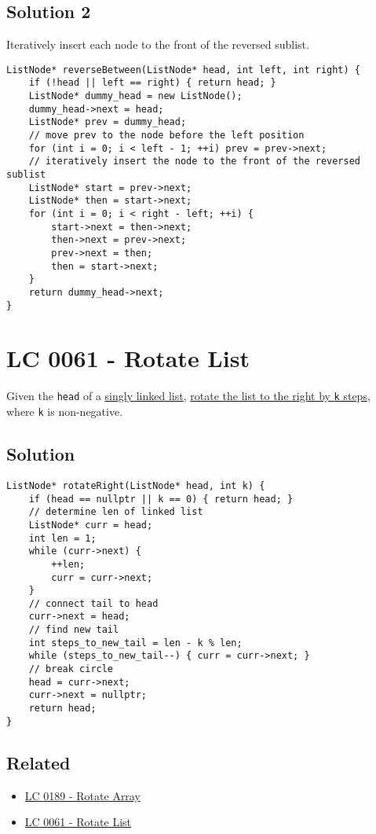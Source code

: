 \subsection*{Solution 2}
Iteratively insert each node to the front of the reversed sublist.
\begin{lstlisting}
ListNode* reverseBetween(ListNode* head, int left, int right) {
	if (!head || left == right) { return head; }
	ListNode* dummy_head = new ListNode();
	dummy_head->next = head;
	ListNode* prev = dummy_head;
	// move prev to the node before the left position
	for (int i = 0; i < left - 1; ++i) prev = prev->next;
	// iteratively insert the node to the front of the reversed sublist
	ListNode* start = prev->next;
	ListNode* then = start->next;
	for (int i = 0; i < right - left; ++i) {
		start->next = then->next;
		then->next = prev->next;
		prev->next = then;
		then = start->next;
	}
	return dummy_head->next;
}
\end{lstlisting}

\section{LC 0061 - Rotate List}\label{lc0061}
Given the {\colorbox{CodeBackground}{\lstinline|head|}} of a \ul{singly linked list}, \ul{rotate the list to the right by {\colorbox{CodeBackground}{\lstinline|k|}} steps}, where {\colorbox{CodeBackground}{\lstinline|k|}} is non-negative.

\subsection*{Solution}
\begin{lstlisting}
ListNode* rotateRight(ListNode* head, int k) {
	if (head == nullptr || k == 0) { return head; }
	// determine len of linked list
	ListNode* curr = head;
	int len = 1;
	while (curr->next) {
		++len;
		curr = curr->next;
	}
	// connect tail to head
	curr->next = head;
	// find new tail
	int steps_to_new_tail = len - k % len;
	while (steps_to_new_tail--) { curr = curr->next; }
	// break circle
	head = curr->next;
	curr->next = nullptr;
	return head;
}
\end{lstlisting}

\subsection*{Related}
\begin{itemize}
	\item \hyperref[lc0189]{LC 0189 - Rotate Array}
	\item \hyperref[lc0061]{LC 0061 - Rotate List}
\end{itemize}


